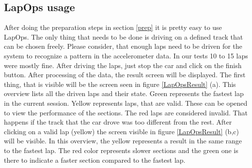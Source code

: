 \subsection{LapOps usage}
After doing the preparation steps in section \ref{prep} it is pretty easy to use LapOps. The only thing that needs to be done is driving on a defined track that can be chosen freely. Please consider, that enough laps need to be driven for the system to recognize a pattern in the accelerometer data. In our tests 10 to 15 laps were mostly fine. After driving the laps, just stop the car and click on the finish button. After processing of the data, the result screen will be displayed. The first thing, that is visible will be the screen seen in figure \ref{LapOpsResult} (a). This overview lists all the driven laps and their state. Green represents the fastest lap in the current session. Yellow represents laps, that are valid. These can be opened to view the performance of the sections. The red laps are considered invalid. That happens if the track that the car drove was too different from the rest. After clicking on a valid lap (yellow) the screen visible in figure \ref{LapOpsResult} (b,c) will be visible. In this overview, the yellow represents a result in the same range to the fastest lap. The red color represents slower sections and the green one is there to indicate a faster section compared to the fastest lap.
